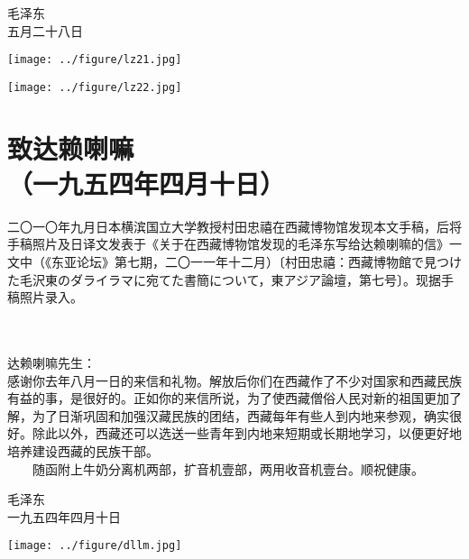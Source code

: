 \documentclass[cn,11pt,chinese]{elegantbook}
\def\myformat#1{\hfil\hfil #1}
\begin{document}
\begin{flushright}
毛泽东\\
五月二十八日
\end{flushright}
\begin{center}
    \texttt{[image: ../figure/lz21.jpg]}
\end{center}
\begin{center}
    \texttt{[image: ../figure/lz22.jpg]}
\end{center}
\newpage

\section*{\myformat{致达赖喇嘛}\\\myformat{（一九五四年四月十日）}}
\begin{introduction}\item
二〇一〇年九月日本横滨国立大学教授村田忠禧在西藏博物馆发现本文手稿，后将手稿照片及日译文发表于《关于在西藏博物馆发现的毛泽东写给达赖喇嘛的信》一文中（《东亚论坛》第七期，二〇一一年十二月）〔村田忠禧：西藏博物館で見つけた毛沢東のダライラマに宛てた書簡について，東アジア論壇，第七号〕。现据手稿照片录入。
\end{introduction}
\\~\\
达赖喇嘛先生：\\
感谢你去年八月一日的来信和礼物。解放后你们在西藏作了不少对国家和西藏民族有益的事，是很好的。正如你的来信所说，为了使西藏僧俗人民对新的祖国更加了解，为了日渐巩固和加强汉藏民族的团结，西藏每年有些人到内地来参观，确实很好。除此以外，西藏还可以选送一些青年到内地来短期或长期地学习，以便更好地培养建设西藏的民族干部。\\
　　随函附上牛奶分离机两部，扩音机壹部，两用收音机壹台。顺祝健康。\\

\begin{flushright}
毛泽东\\
一九五四年四月十日
\end{flushright}

\begin{center}
    \texttt{[image: ../figure/dllm.jpg]}
\end{center}
\end{document}
